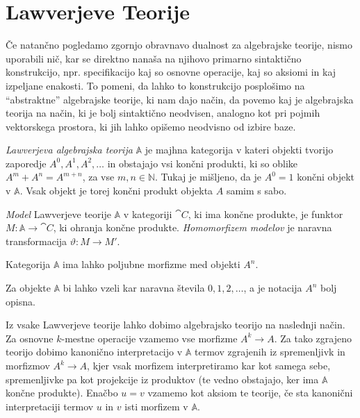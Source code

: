 \documentclass[../kategoricna_logika.tex]{subfiles}
\begin{document}
\section{Lawverjeve Teorije}
\label{sec:org3518651}
Če natančno pogledamo zgornjo obravnavo dualnost za algebrajske teorije, nismo uporabili nič,
kar se direktno nanaša na njihovo primarno sintaktično konstrukcijo, npr. specifikacijo
kaj so osnovne operacije, kaj so aksiomi in kaj izpeljane enakosti.
To pomeni, da lahko to konstrukcijo posplošimo na ``abstraktne'' algebrajske teorije,
ki nam dajo način, da povemo kaj je algebrajska teorija na način, ki je bolj
sintaktično neodvisen, analogno kot pri pojmih vektorskega prostora, ki jih lahko
opišemo neodvisno od izbire baze.
\begin{definicija}
\emph{Lawverjeva algebrajska teorija} \(\mathbb{A}\) je majhna kategorija
v kateri objekti tvorijo zaporedje \(A^0, A^1, A^2, \ldots\) in obstajajo
vsi končni produkti, ki so oblike \(A^m + A^n = A^{m + n}\), za vse \(m,n \in \mathbb{N}\).
Tukaj je mišljeno, da je \(A^0 = 1\) končni objekt v \(\mathbb{A}\).
Vsak objekt je torej končni produkt objekta \(A\) samim s sabo.

\emph{Model} Lawverjeve teorije \(\mathbb{A}\) v kategoriji \(\cat{C}\),
ki ima končne produkte, je funktor \(M : \mathbb{A} \to \cat{C}\),
ki ohranja končne produkte. \emph{Homomorfizem modelov} je naravna
transformacija \(\vartheta : M \to M'\).
\end{definicija}
%
\begin{opomba}
Kategorija \(\mathbb{A}\) ima lahko poljubne morfizme med objekti \(A^n\).
\end{opomba}
\begin{opomba}
Za objekte \(\mathbb{A}\) bi lahko vzeli kar naravna števila \(0, 1, 2, \ldots\),
a je notacija \(A^n\) bolj opisna.
\end{opomba}
%
Iz vsake Lawverjeve teorije lahko dobimo algebrajsko teorijo na naslednji način.
Za osnovne \(k\)-mestne operacije vzamemo vse morfizme \(A^k \to A\). 
Za tako zgrajeno teorijo dobimo kanonično interpretacijo v \(\mathbb{A}\) termov
zgrajenih iz spremenljivk in morfizmov \(A^k \to A\), kjer vsak morfizem interpretiramo
kar kot samega sebe, spremenljivke pa kot projekcije iz produktov (te vedno obstajajo,
ker ima \(\mathbb{A}\) končne produkte). Enačbo \(u = v\) vzamemo kot aksiom te teorije,
če sta kanonični interpretaciji termov \(u\) in \(v\) isti morfizem v \(\mathbb{A}\).
\end{document}

